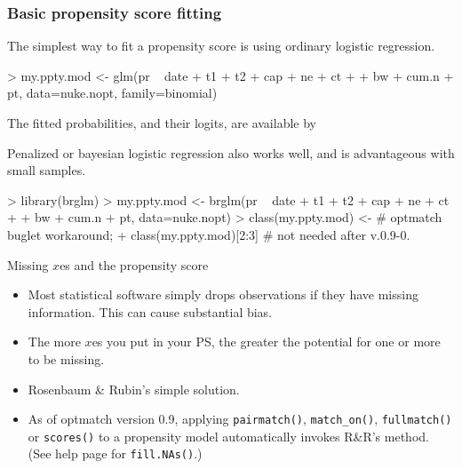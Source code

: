 \begin{frame}[fragile]
  \frametitle{Basic propensity score fitting}

The simplest way to fit a propensity score is using ordinary logistic regression.
\begin{Schunk}
\begin{Sinput}
> my.ppty.mod <- glm(pr ~ date + t1 + t2 + cap + ne + ct + 
+                    bw + cum.n + pt, data=nuke.nopt, family=binomial)
\end{Sinput}
\end{Schunk}


The fitted probabilities, and their logits, are available by
\begin{Schunk}
\end{Schunk}


  Penalized or bayesian logistic regression also works well, and is advantageous with small samples.
\begin{Schunk}
\begin{Sinput}
> library(brglm)
> my.ppty.mod <- brglm(pr ~ date + t1 + t2 + cap + ne + ct + 
+                      bw + cum.n + pt, data=nuke.nopt)
> class(my.ppty.mod) <-  # optmatch buglet workaround;
+   class(my.ppty.mod)[2:3] # not needed after v.0.9-0.
\end{Sinput}
\end{Schunk}


\end{frame}


\begin{frame}{Missing $x$es and the propensity score}
  
  \begin{itemize}
  \item Most statistical software simply drops observations if they
    have missing information.  This can cause substantial bias.
  \item The more $x$es you put in your PS, the greater the potential
    for one or more to be missing.
  \item Rosenbaum \& Rubin's \citeyearpar{rosenbaum:rubi:1984a} simple solution.
  \item As of optmatch version 0.9, applying \texttt{pairmatch()}, \texttt{match\_on()},
    \texttt{fullmatch()} or \texttt{scores()} to a propensity model
    automatically invokes R\&R's method.  (See help page for \texttt{fill.NAs()}.)
  \end{itemize}
  
\end{frame}

